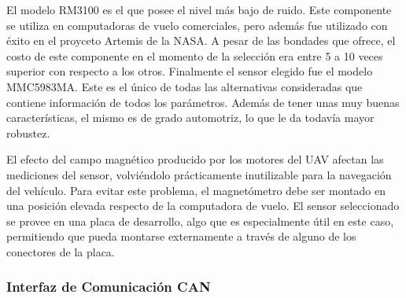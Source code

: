El modelo RM3100 es el que posee el nivel más bajo de ruido. Este componente se utiliza en computadoras de vuelo comerciales, pero además fue utilizado con éxito en el proyceto Artemis de la NASA. A pesar de las bondades que ofrece, el costo de este componente en el momento de la selección era entre 5 a 10 veces superior con respecto a los otros. Finalmente el sensor elegido fue el modelo MMC5983MA. Este es el único de todas las alternativas consideradas que contiene información de todos los parámetros. Además de tener unas muy buenas características, el mismo es de grado automotriz, lo que le da todavía mayor robustez. 

El efecto del campo magnético producido por los motores del UAV afectan las mediciones del sensor, volviéndolo prácticamente inutilizable para la navegación del vehículo. Para evitar este problema, el magnetómetro debe ser montado en una posición elevada respecto de la computadora de vuelo. El sensor seleccionado se provee en una placa de desarrollo, algo que es especialmente útil en este caso, permitiendo que pueda montarse externamente a través de alguno de los conectores de la placa.

\subsubsection{Interfaz de Comunicación CAN}\label{sec:interfaz_CAN}


